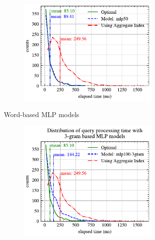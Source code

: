\documentclass[conference]{IEEEtran}
\begin{document}
\begin{figure}[!th]
\begin{subfigure}{0.45\textwidth}
\begin{subfigure}{\textwidth}
		\end{subfigure}
		\vfill
		\begin{subfigure}{\textwidth}
			\centering
%			
			\includegraphics[]{graphics/perf_dist_mlp50_A.pdf}
		\end{subfigure}
		\caption{Word-based MLP models}
	\end{subfigure}
	\hfill
	\begin{subfigure}{0.45\textwidth}
		\begin{subfigure}{\textwidth}
			\centering
%			
			\includegraphics[]{graphics/perf_dist_mlp100_3gram_A.pdf}
		\end{subfigure}
		\vfill
		\begin{subfigure}{\textwidth}

\end{subfigure}
\end{subfigure}
\end{figure}
\end{document}
